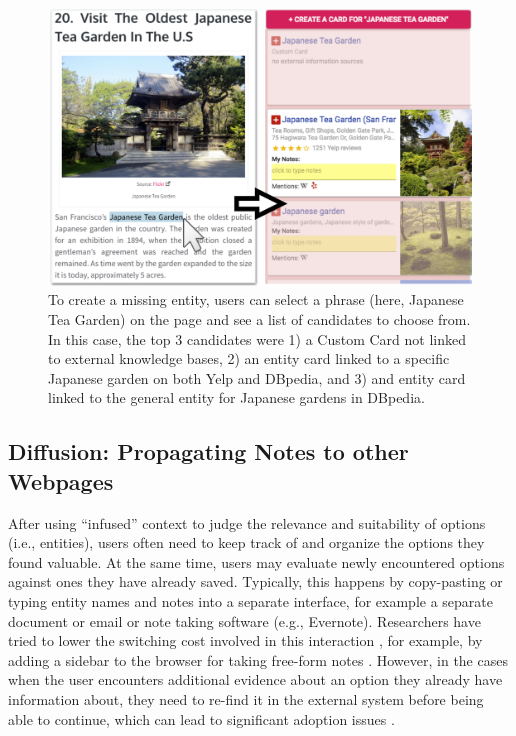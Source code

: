 \begin{figure}
    \centering
    \includegraphics[width=0.5\columnwidth]{Chapters/Fusion2/custom4.png}
    \caption[Creating manual entity cards.]{To create a missing entity, users can select a phrase (here, Japanese Tea Garden) on the page and see a list of candidates to choose from. In this case, the top 3 candidates were 1) a Custom Card not linked to external knowledge bases, 2) an entity card linked to a specific Japanese garden on both Yelp and DBpedia, and 3) and entity card linked to the general entity for Japanese gardens in DBpedia.}
    \label{fig:custom_fusion}
\end{figure}


\subsection{Diffusion: Propagating Notes to other Webpages}

After using ``infused'' context to judge the relevance and suitability of options (i.e., entities), users often need to keep track of and organize the options they found valuable. At the same time, users may evaluate newly encountered options against ones they have already saved. Typically, this happens by copy-pasting or typing entity names and notes into a separate interface, for example a separate document or email or note taking software (e.g., Evernote). Researchers have tried to lower the switching cost involved in this interaction \cite{o1996towards,tashman2011liquidtext}, for example, by adding a sidebar to the browser for taking free-form notes \cite{notetoself}. However, in the cases when the user encounters additional evidence about an option they already have information about, they need to re-find it in the external system before being able to continue, which can lead to significant adoption issues \cite{notetoself}.

